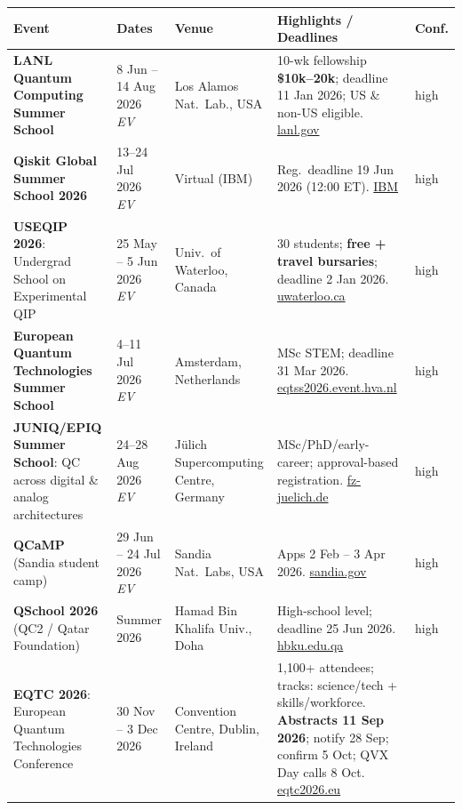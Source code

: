 \documentclass[11pt,a4paper]{article}
\newcommand{\ev}{\emph{EV}}
\begin{document}
\begin{longtable}{@{}p{3.2cm}p{3.0cm}p{2.5cm}p{5.2cm}p{1.6cm}@{}}
\toprule
\textbf{Event} & \textbf{Dates} & \textbf{Venue} & \textbf{Highlights / Deadlines} & \textbf{Conf.} \\
\midrule
\endhead
\textbf{LANL Quantum Computing Summer School}
  & 8 Jun -- 14 Aug 2026 \ev{}
  & Los Alamos Nat.\ Lab., USA
  & 10-wk fellowship \textbf{\$10k--20k}; deadline 11 Jan 2026; US \& non-US eligible. \href{https://www.lanl.gov/engage/collaboration/internships/summer-schools/quantumschool}{lanl.gov}
  & high \\
\midrule
\textbf{Qiskit Global Summer School 2026}
  & 13--24 Jul 2026 \ev{}
  & Virtual (IBM)
  & Reg.\ deadline 19 Jun 2026 (12:00 ET). \href{https://www.ibm.com/quantum/blog/qiskit-summer-school-2026}{IBM}
  & high \\
\midrule
\textbf{USEQIP 2026}: Undergrad School on Experimental QIP
  & 25 May -- 5 Jun 2026 \ev{}
  & Univ.\ of Waterloo, Canada
  & 30 students; \textbf{free + travel bursaries}; deadline 2 Jan 2026. \href{https://uwaterloo.ca/institute-for-quantum-computing/events/useqip-2026}{uwaterloo.ca}
  & high \\
\midrule
\textbf{European Quantum Technologies Summer School}
  & 4--11 Jul 2026 \ev{}
  & Amsterdam, Netherlands
  & MSc STEM; deadline 31 Mar 2026. \href{https://eqtss2026.event.hva.nl/}{eqtss2026.event.hva.nl}
  & high \\
\midrule
\textbf{JUNIQ/EPIQ Summer School}: QC across digital \& analog architectures
  & 24--28 Aug 2026 \ev{}
  & Jülich Supercomputing Centre, Germany
  & MSc/PhD/early-career; approval-based registration. \href{https://www.fz-juelich.de/en/jsc/systems/quantum-computing/juniq-facility/training/summer_school_2026}{fz-juelich.de}
  & high \\
\midrule
\textbf{QCaMP} (Sandia student camp)
  & 29 Jun -- 24 Jul 2026 \ev{}
  & Sandia Nat.\ Labs, USA
  & Apps 2 Feb -- 3 Apr 2026. \href{https://www.sandia.gov/quantum/qcamp-students/}{sandia.gov}
  & high \\
\midrule
\textbf{QSchool 2026} (QC2 / Qatar Foundation)
  & Summer 2026
  & Hamad Bin Khalifa Univ., Doha
  & High-school level; deadline 25 Jun 2026. \href{https://www.hbku.edu.qa/en/academic-events/CSE-QS26}{hbku.edu.qa}
  & high \\
\midrule
\textbf{EQTC 2026}: European Quantum Technologies Conference
  & 30 Nov -- 3 Dec 2026
  & Convention Centre, Dublin, Ireland
  & 1{,}100+ attendees; tracks: science/tech + skills/workforce. \textbf{Abstracts 11 Sep 2026}; notify 28 Sep; confirm 5 Oct; QVX Day calls 8 Oct. \href{https://www.eqtc2026.eu/}{eqtc2026.eu}

\end{longtable}
\end{document}
